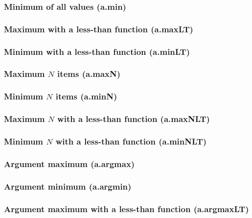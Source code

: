 \documentclass{article}
\theoremstyle{definition}
\begin{document}
\subsubsection{Minimum of all values (a.min)}

\subsubsection{Maximum with a less-than function (a.maxLT)}

\subsubsection{Minimum with a less-than function (a.minLT)}

\subsubsection{Maximum $N$ items (a.maxN)}

\subsubsection{Minimum $N$ items (a.minN)}

\subsubsection{Maximum $N$ with a less-than function (a.maxNLT)}

\subsubsection{Minimum $N$ with a less-than function (a.minNLT)}

\subsubsection{Argument maximum (a.argmax)}

\subsubsection{Argument minimum (a.argmin)}

\subsubsection{Argument maximum with a less-than function (a.argmaxLT)}
\end{document}
